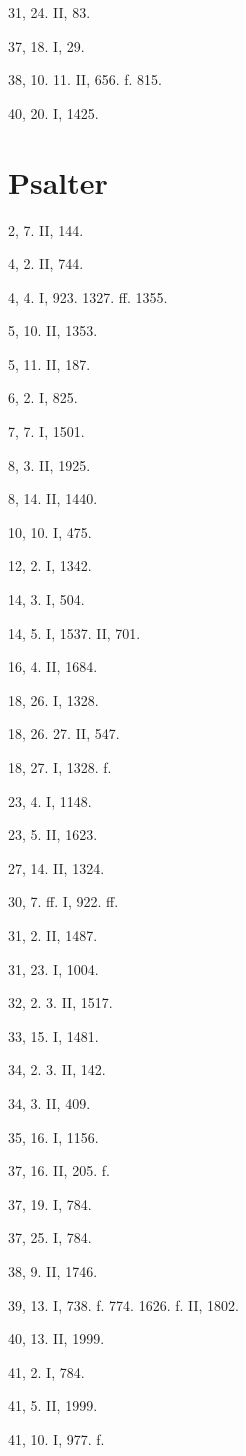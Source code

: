 31, 24. II, 83.

37, 18. I, 29.

38, 10. 11. II, 656. f. 815.

40, 20. I, 1425.

\section{Psalter}

2, 7. II, 144.

4, 2. II, 744.

4, 4. I, 923. 1327. ff. 1355.

5, 10. II, 1353.

5, 11. II, 187.

6, 2. I, 825.

7, 7. I, 1501.

8, 3. II, 1925.

8, 14. II, 1440.

10, 10. I, 475.

12, 2. I, 1342.

14, 3. I, 504.

14, 5. I, 1537. II, 701.

16, 4. II, 1684.

18, 26. I, 1328.

18, 26. 27. II, 547.

18, 27. I, 1328. f.

23, 4. I, 1148.

23, 5. II, 1623.

27, 14. II, 1324.

30, 7. ff. I, 922. ff.

31, 2. II, 1487.

31, 23. I, 1004.

32, 2. 3. II, 1517.

33, 15. I, 1481.

34, 2. 3. II, 142.

34, 3. II, 409.

35, 16. I, 1156.

37, 16. II, 205. f.

37, 19. I, 784.

37, 25. I, 784.

38, 9. II, 1746.

39, 13. I, 738. f. 774. 1626. f. II, 1802.

40, 13. II, 1999.

41, 2. I, 784.

41, 5. II, 1999.

41, 10. I, 977. f.

